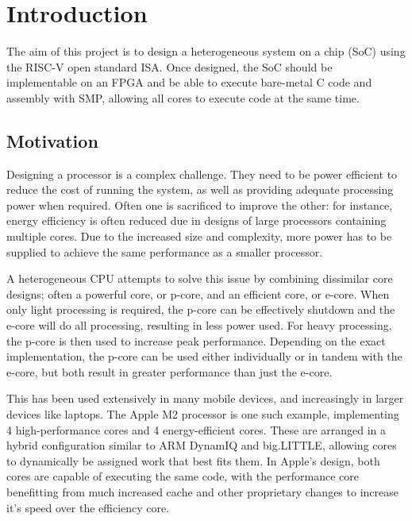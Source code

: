 \chapter{Introduction}
\label{ch:introduction}

The aim of this project is to design a heterogeneous system on a chip (SoC) using the RISC-V open standard ISA\cite{riscv-1}\cite{riscv-2}. Once designed, the SoC should be implementable on an FPGA and be able to execute bare-metal C code and assembly with SMP, allowing all cores to execute code at the same time.

\section{Motivation}
Designing a processor is a complex challenge. They need to be power efficient to reduce the cost of running the system, as well as providing adequate processing power when required. Often one is sacrificed to improve the other: for instance, energy efficiency is often reduced due in designs of large processors containing multiple cores. Due to the increased size and complexity, more power has to be supplied to achieve the same performance as a smaller processor.

A heterogeneous CPU attempts to solve this issue by combining dissimilar core designs; often a powerful core, or p-core, and an efficient core, or e-core. When only light processing is required, the p-core can be effectively shutdown and the e-core will do all processing, resulting in less power used. For heavy processing, the p-core is then used to increase peak performance. Depending on the exact implementation, the p-core can be used either individually or in tandem with the e-core, but both result in greater performance than just the e-core.

This has been used extensively in many mobile devices, and increasingly in larger devices like laptops. The Apple M2 processor\cite{applem2} is one such example, implementing 4 high-performance cores and 4 energy-efficient cores. These are arranged in a hybrid configuration similar to ARM DynamIQ and big.LITTLE\cite{biglittle}, allowing cores to dynamically be assigned work that best fits them. In Apple's design, both cores are capable of executing the same code, with the performance core benefitting from much increased cache and other proprietary changes to increase it's speed over the efficiency core. 

